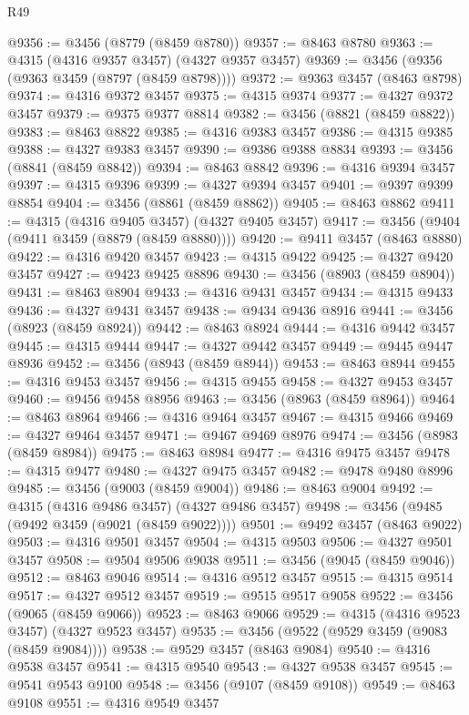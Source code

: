 \begin{lexlean}{R49}
\begin{coremodule}
@9356 := @3456 (@8779 (@8459 @8780))
@9357 := @8463 @8780
@9363 := @4315 (@4316 @9357 @3457) (@4327 @9357 @3457)
@9369 := @3456 (@9356 (@9363 @3459 (@8797 (@8459 @8798))))
@9372 := @9363 @3457 (@8463 @8798)
@9374 := @4316 @9372 @3457
@9375 := @4315 @9374
@9377 := @4327 @9372 @3457
@9379 := @9375 @9377 @8814
@9382 := @3456 (@8821 (@8459 @8822))
@9383 := @8463 @8822
@9385 := @4316 @9383 @3457
@9386 := @4315 @9385
@9388 := @4327 @9383 @3457
@9390 := @9386 @9388 @8834
@9393 := @3456 (@8841 (@8459 @8842))
@9394 := @8463 @8842
@9396 := @4316 @9394 @3457
@9397 := @4315 @9396
@9399 := @4327 @9394 @3457
@9401 := @9397 @9399 @8854
@9404 := @3456 (@8861 (@8459 @8862))
@9405 := @8463 @8862
@9411 := @4315 (@4316 @9405 @3457) (@4327 @9405 @3457)
@9417 := @3456 (@9404 (@9411 @3459 (@8879 (@8459 @8880))))
@9420 := @9411 @3457 (@8463 @8880)
@9422 := @4316 @9420 @3457
@9423 := @4315 @9422
@9425 := @4327 @9420 @3457
@9427 := @9423 @9425 @8896
@9430 := @3456 (@8903 (@8459 @8904))
@9431 := @8463 @8904
@9433 := @4316 @9431 @3457
@9434 := @4315 @9433
@9436 := @4327 @9431 @3457
@9438 := @9434 @9436 @8916
@9441 := @3456 (@8923 (@8459 @8924))
@9442 := @8463 @8924
@9444 := @4316 @9442 @3457
@9445 := @4315 @9444
@9447 := @4327 @9442 @3457
@9449 := @9445 @9447 @8936
@9452 := @3456 (@8943 (@8459 @8944))
@9453 := @8463 @8944
@9455 := @4316 @9453 @3457
@9456 := @4315 @9455
@9458 := @4327 @9453 @3457
@9460 := @9456 @9458 @8956
@9463 := @3456 (@8963 (@8459 @8964))
@9464 := @8463 @8964
@9466 := @4316 @9464 @3457
@9467 := @4315 @9466
@9469 := @4327 @9464 @3457
@9471 := @9467 @9469 @8976
@9474 := @3456 (@8983 (@8459 @8984))
@9475 := @8463 @8984
@9477 := @4316 @9475 @3457
@9478 := @4315 @9477
@9480 := @4327 @9475 @3457
@9482 := @9478 @9480 @8996
@9485 := @3456 (@9003 (@8459 @9004))
@9486 := @8463 @9004
@9492 := @4315 (@4316 @9486 @3457) (@4327 @9486 @3457)
@9498 := @3456 (@9485 (@9492 @3459 (@9021 (@8459 @9022))))
@9501 := @9492 @3457 (@8463 @9022)
@9503 := @4316 @9501 @3457
@9504 := @4315 @9503
@9506 := @4327 @9501 @3457
@9508 := @9504 @9506 @9038
@9511 := @3456 (@9045 (@8459 @9046))
@9512 := @8463 @9046
@9514 := @4316 @9512 @3457
@9515 := @4315 @9514
@9517 := @4327 @9512 @3457
@9519 := @9515 @9517 @9058
@9522 := @3456 (@9065 (@8459 @9066))
@9523 := @8463 @9066
@9529 := @4315 (@4316 @9523 @3457) (@4327 @9523 @3457)
@9535 := @3456 (@9522 (@9529 @3459 (@9083 (@8459 @9084))))
@9538 := @9529 @3457 (@8463 @9084)
@9540 := @4316 @9538 @3457
@9541 := @4315 @9540
@9543 := @4327 @9538 @3457
@9545 := @9541 @9543 @9100
@9548 := @3456 (@9107 (@8459 @9108))
@9549 := @8463 @9108
@9551 := @4316 @9549 @3457

\end{coremodule}
\end{lexlean}
